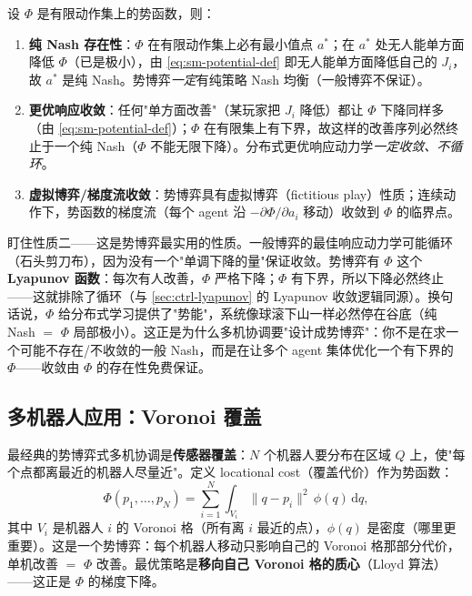 \begin{theorem}[势博弈的三个核心性质]\label{thm:sm-potential-props}
设 $\Phi$ 是有限动作集上的势函数，则：
\begin{enumerate}
  \item \textbf{纯 Nash 存在性}：$\Phi$ 在有限动作集上必有最小值点 $a^*$；在 $a^*$ 处无人能单方面降低 $\Phi$（已是极小），由 \cref{eq:sm-potential-def} 即无人能单方面降低自己的 $J_i$，故 $a^*$ 是纯 Nash。势博弈\emph{一定}有纯策略 Nash 均衡（一般博弈不保证）。
  \item \textbf{更优响应收敛}：任何"单方面改善"（某玩家把 $J_i$ 降低）都让 $\Phi$ 下降同样多（由 \cref{eq:sm-potential-def}）；$\Phi$ 在有限集上有下界，故这样的改善序列必然终止于一个纯 Nash（$\Phi$ 不能无限下降）。分布式更优响应动力学\emph{一定收敛、不循环}。
  \item \textbf{虚拟博弈/梯度流收敛}：势博弈具有虚拟博弈（fictitious play）性质\cite{monderer1996potential}；连续动作下，势函数的梯度流（每个 agent 沿 $-\partial\Phi/\partial a_i$ 移动）收敛到 $\Phi$ 的临界点。
\end{enumerate}
\end{theorem}

\begin{insight}
盯住性质二——这是势博弈最实用的性质。一般博弈的最佳响应动力学可能循环（石头剪刀布），因为没有一个"单调下降的量"保证收敛。势博弈有 $\Phi$ 这个\textbf{Lyapunov 函数}：每次有人改善，$\Phi$ 严格下降；$\Phi$ 有下界，所以下降必然终止——这就排除了循环（与 \cref{sec:ctrl-lyapunov} 的 Lyapunov 收敛逻辑同源）。换句话说，$\Phi$ 给分布式学习提供了"势能"，系统像球滚下山一样必然停在谷底（纯 Nash $=$ $\Phi$ 局部极小）。这正是为什么多机协调要"设计成势博弈"：你不是在求一个可能不存在/不收敛的一般 Nash，而是在让多个 agent 集体优化一个有下界的 $\Phi$——收敛由 $\Phi$ 的存在性免费保证。
\end{insight}

\subsection{多机器人应用：Voronoi 覆盖}

最经典的势博弈式多机协调是\textbf{传感器覆盖}：$N$ 个机器人要分布在区域 $Q$ 上，使"每个点都离最近的机器人尽量近"。定义 locational cost（覆盖代价）作为势函数：
\begin{equation}
  \Phi(p_1,\dots,p_N)=\sum_{i=1}^N\int_{V_i}\|q-p_i\|^2\,\phi(q)\,\mathrm dq,
  \label{eq:sm-voronoi}
\end{equation}
其中 $V_i$ 是机器人 $i$ 的 Voronoi 格（所有离 $i$ 最近的点），$\phi(q)$ 是密度（哪里更重要）。这是一个势博弈：每个机器人移动只影响自己的 Voronoi 格那部分代价，单机改善 $=$ $\Phi$ 改善。最优策略是\textbf{移向自己 Voronoi 格的质心}（Lloyd 算法）——这正是 $\Phi$ 的梯度下降。

